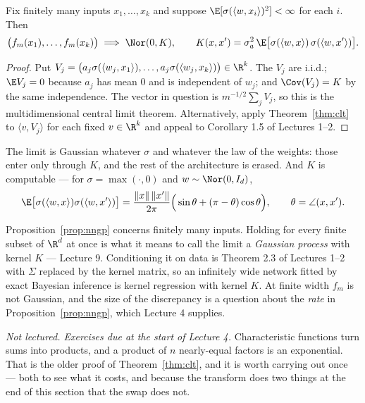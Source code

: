 \documentclass[11pt]{article}
\begin{document}
\begin{proposition}\label{prop:nngp}
Fix finitely many inputs $x_1,\dots,x_k$ and suppose $\E[\sigma(\langle w,x_i\rangle)^2]<\infty$ for each $i$. Then
\[
\big(f_m(x_1),\dots,f_m(x_k)\big)\;\Longrightarrow\;\Nor(0,K),\qquad
K(x,x')=\sigma_a^2\,\E\big[\sigma(\langle w,x\rangle)\,\sigma(\langle w,x'\rangle)\big].
\]
\end{proposition}

\begin{proof}
Put $V_j=\big(a_j\sigma(\langle w_j,x_1\rangle),\dots,a_j\sigma(\langle w_j,x_k\rangle)\big)\in\R^k$. The $V_j$ are i.i.d.; $\E V_j=0$ because $a_j$ has mean $0$ and is independent of $w_j$; and $\Cov(V_j)=K$ by the same independence. The vector in question is $m^{-1/2}\sum_j V_j$, so this is the multidimensional central limit theorem. Alternatively, apply Theorem~\ref{thm:clt} to $\langle v,V_j\rangle$ for each fixed $v\in\R^k$ and appeal to Corollary 1.5 of Lectures 1--2.
\end{proof}

The limit is Gaussian whatever $\sigma$ and whatever the law of the weights: those enter only through $K$, and the rest of the architecture is erased. And $K$ is computable --- for $\sigma=\max(\cdot,0)$ and $w\sim\Nor(0,I_d)$,
\[
\E\big[\sigma(\langle w,x\rangle)\sigma(\langle w,x'\rangle)\big]
=\frac{\|x\|\,\|x'\|}{2\pi}\Big(\sin\theta+(\pi-\theta)\cos\theta\Big),
\qquad \theta=\angle(x,x') .
\]

\begin{remark}
Proposition~\ref{prop:nngp} concerns finitely many inputs. Holding for every finite subset of $\R^d$ at once is what it means to call the limit a \emph{Gaussian process} with kernel $K$ --- Lecture 9. Conditioning it on data is Theorem 2.3 of Lectures 1--2 with $\Sigma$ replaced by the kernel matrix, so an infinitely wide network fitted by exact Bayesian inference is kernel regression with kernel $K$. At finite width $f_m$ is not Gaussian, and the size of the discrepancy is a question about the \emph{rate} in Proposition~\ref{prop:nngp}, which Lecture 4 supplies.
\end{remark}


\label{sec:transformproof}

\emph{Not lectured. Exercises due at the start of Lecture 4.} Characteristic functions turn sums into products, and a product of $n$ nearly-equal factors is an exponential. That is the older proof of Theorem~\ref{thm:clt}, and it is worth carrying out once --- both to see what it costs, and because the transform does two things at the end of this section that the swap does not.
\end{document}
